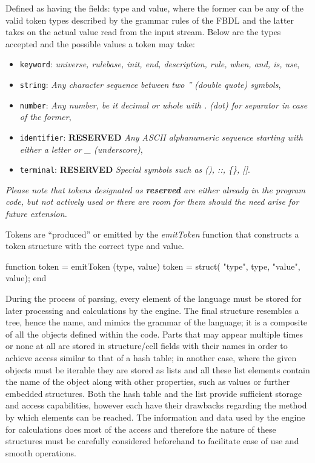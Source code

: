 Defined as having the fields: type and value, where the former can be any of the valid token types described by the grammar rules of the FBDL and the latter takes on the actual value read from the input stream. Below are the types accepted and the possible values a token may take:

\begin{itemize}
	\item \texttt{keyword}: \textit{universe, rulebase, init, end, description, rule, when, and, is, use},
	\item \texttt{string}: \textit{Any character sequence between two '' (double quote) symbols},
	\item \texttt{number}: \textit{Any number, be it decimal or whole with . (dot) for separator in case of the former},
	\item \texttt{identifier}: \textbf{RESERVED} \textit{Any ASCII alphanumeric sequence starting with either a letter or \_ (underscore)},
	\item \texttt{terminal}: \textbf{RESERVED} \textit{Special symbols such as (), ::, \{\}, []}.
\end{itemize}

\textit{Please note that tokens designated as \textbf{reserved} are either already in the program code, but not actively used or there are room for them should the need arise for future extension.}

Tokens are ``produced'' or emitted by the \textit{emitToken}  function that constructs a token structure with the correct type and value.

\begin{octave}
function token = emitToken (type, value)
  token = struct(
    "type", type,
    "value", value);
end
\end{octave}

During the process of parsing, every element of the language must be stored for later processing and calculations by the engine. The final structure resembles a tree, hence the name, and mimics the grammar of the language; it is a composite of all the objects defined within the code. Parts that may appear multiple times or none at all are stored in structure/cell fields with their names in order to achieve access similar to that of a hash table; in another case, where the given objects must be iterable they are stored as lists and all these list elements contain the name of the object along with other properties, such as values or further embedded structures. Both the hash table and the list provide sufficient storage and access capabilities, however each have their drawbacks regarding the method by which elements can be reached. The information and data used by the engine for calculations does most of the access and therefore the nature of these structures must be carefully considered beforehand to facilitate ease of use and smooth operations.


